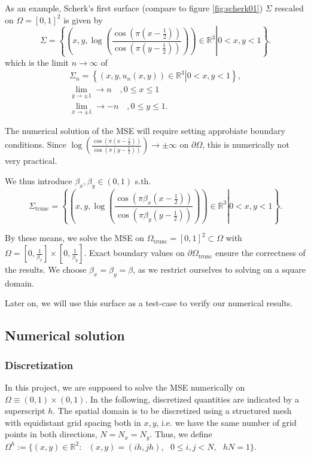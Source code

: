 \documentclass[11pt]{scrartcl}
\begin{document}
\newpage

As an example, Scherk's first surface (compare to figure \ref{fig:scherk01}) $\Sigma$ rescaled on $\Omega = [0,1]^2$ is given by
\begin{equation}
	\Sigma = \left\{ \left. \left(x, y, \log \left( \frac{\cos (\pi(x-\frac{1}{2}))}{\cos (\pi(y-\frac{1}{2}))} \right) \right) \in \mathbb{R}^{3} \right  | 0 < x, y < 1 \right\}.
\end{equation} 
which is the limit $n\to \infty$ of 
\begin{align}
\Sigma_n = \left\{ \left. \left(x, y, u_n(x,y) \right) \in \mathbb{R}^{3} \right  | 0 < x, y < 1 \right\}, \\
\lim\limits_{y\to \pm 1} \to n \quad, 0 \le x \le 1 \\
\lim\limits_{x\to \pm 1} \to -n \quad, 0 \le y \le 1.
\end{align}
\cite{wiki:scherk}

The numerical solution of the MSE will require setting approbiate boundary conditions. Since $\log \left( \frac{\cos (\pi(x-\frac{1}{2}))}{\cos (\pi(y-\frac{1}{2}))} \right) \to \pm \infty $ on $\partial\Omega$, this is numerically not very practical. 

We thus introduce $\beta_x,\beta_y \in (0,1)$ s.th. 
\begin{equation}
\Sigma_{\text{trunc}} = \left\{ \left. \left(x, y, \log \left( \frac{\cos (\pi\beta_x(x-\frac{1}{2}))}{\cos (\pi\beta_y(y-\frac{1}{2}))} \right) \right) \in \mathbb{R}^{3} \right  | 0 < x, y < 1 \right\}.
\end{equation} 

By these means, we solve the MSE on $\Omega_\text{trunc}=[0,1]^2\subset\Omega$ with $\Omega=[0,\frac{1}{\beta_x}]\times[0,\frac{1}{\beta_y}]$. Exact boundary values on $\partial\Omega_\text{trunc}$ ensure the correctness of the results. We choose $\beta_x=\beta_y=\beta$, as we restrict ourselves to solving on a square domain.

Later on, we will use this surface as a test-case to verify our numerical results.

\newpage
\subsection{Numerical solution}
\subsubsection{Discretization}
\label{section:Discretization}
In this project, we are supposed to solve the MSE numerically on $\Omega \equiv (0,1)\times(0,1)$. In the following, discretized quantities are indicated by a superscript $h$. The spatial domain is to be discretized using a structured mesh with equidistant grid spacing both in $x,y$, i.e. we have the same number of grid points in both directions, $N=N_x=N_y$. Thus, we define $\Omega^h := \{ (x,y) \in \mathbb{R}^2:\text{ }(x,y) = (ih, jh), \text{ } 0 \le i,j < N,\text{ }hN=1\}$.
\end{document}
